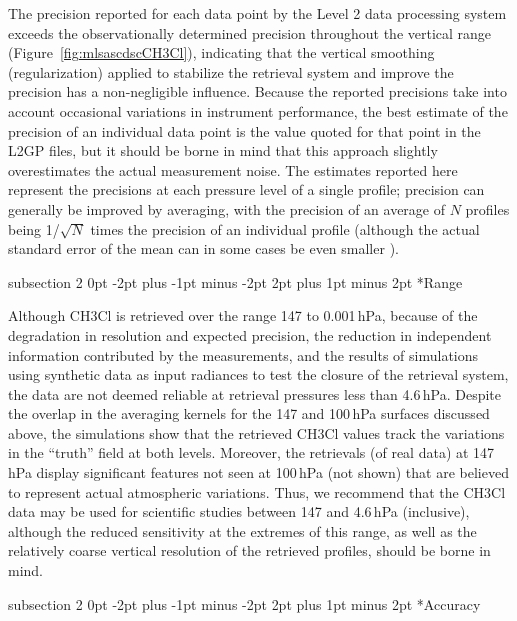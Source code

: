 \documentclass[11pt,draft]{report}
\makeatletter
\renewcommand{\subsection}{\@startsection%
  {subsection}%
  {2}%
  {0pt}%
  {-2pt plus -1pt minus -2pt}%
  {2pt plus 1pt minus 2pt}%
  {\large\sffamily\fontseries{sb}\selectfont\flushleft\color{SectionColor}\figureversion{tabular}}}%
\makeatother
\begin{document}
The precision reported for each data point by the Level 2 data
processing system exceeds the observationally determined precision
throughout the vertical range (Figure~\ref{fig:mlsascdscCH3Cl}),
indicating that the vertical smoothing (regularization) applied to
stabilize the retrieval system and improve the precision has a
non-negligible influence. Because the reported precisions take into
account occasional variations in instrument performance, the best
estimate of the precision of an individual data point is the value
quoted for that point in the L2GP files, but it should be borne in mind
that this approach slightly overestimates the actual measurement
noise. The estimates reported here represent the precisions at each
pressure level of a single profile; precision can generally be improved
by averaging, with the precision of an average of $N$ profiles being
1/$\sqrt{N}$ times the precision of an individual profile (although the
actual standard error of the mean can in some cases be even smaller
\citep{TooheyAndVonClarmann13}).

\subsection*{Range}

Although CH\cs3Cl is retrieved over the range 147 to 0.001\,hPa, because
of the degradation in resolution and expected precision, the reduction
in independent information contributed by the measurements, and the
results of simulations using synthetic data as input radiances to test
the closure of the retrieval system, the data are not deemed reliable at
retrieval pressures less than 4.6\,hPa. Despite the overlap in the
averaging kernels for the 147 and 100\,hPa surfaces discussed above, the
simulations show that the retrieved CH\cs3Cl values track the variations
in the ``truth'' field at both levels.  Moreover, the retrievals (of
real data) at 147\,hPa display significant features not seen at 100\,hPa
(not shown) that are believed to represent actual atmospheric
variations. Thus, we recommend that the \thisv CH\cs3Cl data may be used
for scientific studies between 147 and 4.6\,hPa (inclusive), although
the reduced sensitivity at the extremes of this range, as well as the
relatively coarse vertical resolution of the retrieved profiles, should
be borne in mind.

\subsection*{Accuracy}
\end{document}
